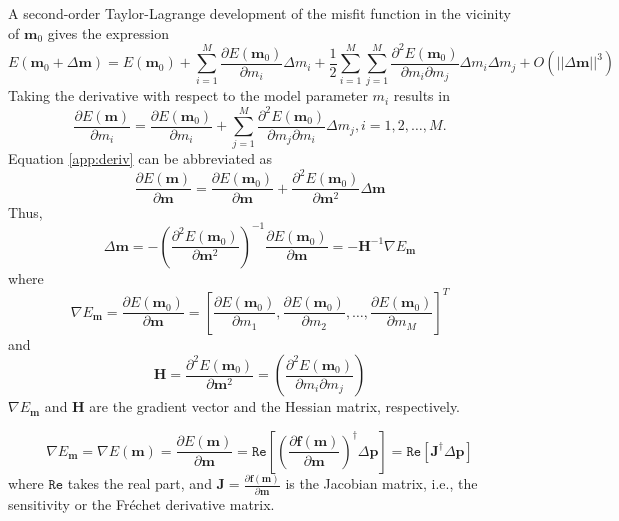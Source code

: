 A second-order Taylor-Lagrange development of the misfit function in the vicinity of $\textbf{m}_0$ gives the expression
\begin{equation}
E(\textbf{m}_0+\Delta \textbf{m})=E(\textbf{m}_0)
+\sum_{i=1}^M\frac{\partial E(\textbf{m}_0)}{\partial m_i}\Delta m_i
+\frac{1}{2}\sum_{i=1}^M\sum_{j=1}^M \frac{\partial^2 E(\textbf{m}_0)}{\partial m_i \partial m_j}\Delta m_i \Delta m_j+O(||\Delta\textbf{m}||^3)
\end{equation}
Taking the derivative with respect to the model parameter $m_i$ results in
\begin{equation}\label{app:deriv}
\frac{\partial E(\textbf{m})}{\partial m_i}=\frac{\partial E(\textbf{m}_0)}{\partial m_i}+\sum_{j=1}^M \frac{\partial^2 E(\textbf{m}_0)}{\partial m_j \partial m_i}\Delta m_j,
i=1,2,\ldots,M.
\end{equation}
Equation \eqref{app:deriv} can be abbreviated as
\begin{equation}
\frac{\partial E(\textbf{m})}{\partial \textbf{m}}=\frac{\partial E(\textbf{m}_0)}{\partial \textbf{m}}+\frac{\partial^2 E(\textbf{m}_0)}{\partial\textbf{m}^2}\Delta \textbf{m}
\end{equation}
Thus,
\begin{equation}\label{eq:deltam}
\Delta \textbf{m}=-\left(\frac{\partial^2 E(\textbf{m}_0)}{\partial\textbf{m}^2}\right)^{-1}\frac{\partial E(\textbf{m}_0)}{\partial \textbf{m}}=-\textbf{H}^{-1}\nabla E_{\textbf{m}}
\end{equation}
where 
\begin{equation}
\nabla E_{\textbf{m}}=\frac{\partial E(\textbf{m}_0)}{\partial \textbf{m}}=\left[
\frac{\partial E(\textbf{m}_0)}{\partial m_1},
\frac{\partial E(\textbf{m}_0)}{\partial m_2},
\ldots,
\frac{\partial E(\textbf{m}_0)}{\partial m_M}\right]^T
\end{equation}
and
\begin{equation}
\textbf{H}=\frac{\partial^2 E(\textbf{m}_0)}{\partial\textbf{m}^2}
=\left(\frac{\partial^2 E(\textbf{m}_0)}{\partial m_i\partial m_j}\right)
\end{equation}
$\nabla E_{\textbf{m}}$ and $\textbf{H}$ are the gradient vector and the Hessian matrix, respectively.


\begin{equation}\label{eq:grad}
\nabla E_{\textbf{m}}=\nabla E(\textbf{m})=\frac{\partial E(\textbf{m})}{\partial \textbf{m}}
=\mathtt{Re}\left[\left(\frac{\partial \textbf{f}(\textbf{m})}{\partial \textbf{m}}\right)^{\dagger}\Delta \textbf{p}\right]
=\mathtt{Re}\left[\textbf{J}^{\dagger}\Delta \textbf{p}\right]
\end{equation}
where $\mathtt{Re}$ takes the real part, and $\textbf{J}=\frac{\partial \textbf{f}(\textbf{m})}{\partial \textbf{m}}$ is the Jacobian matrix, i.e., the sensitivity or the Fréchet derivative matrix.


